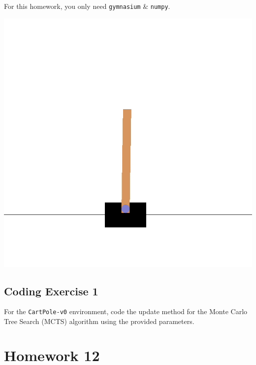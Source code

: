 \documentclass[
  letterpaper,
  DIV=11,
  numbers=noendperiod]{scrreprt}
\makeatletter
\newcommand*\pandocbounded[1]{%
  \sbox\pandoc@box{#1}%
  \Gscale@div\@tempa{\textheight}{\dimexpr\ht\pandoc@box+\dp\pandoc@box\relax}%
  \Gscale@div\@tempb{\linewidth}{\wd\pandoc@box}%
  \ifdim\@tempb\p@<\@tempa\p@\let\@tempa\@tempb\fi%
  \ifdim\@tempa\p@<\p@\scalebox{\@tempa}{\usebox\pandoc@box}%
  \else\usebox{\pandoc@box}%
  \fi%
}
\makeatother
\begin{document}
\begin{tcolorbox}[enhanced jigsaw, opacityback=0, left=2mm, breakable, bottomtitle=1mm, rightrule=.15mm, colframe=quarto-callout-note-color-frame, titlerule=0mm, colback=white, opacitybacktitle=0.6, toptitle=1mm, title=\textcolor{quarto-callout-note-color}{\faInfo}\hspace{0.5em}{Note}, colbacktitle=quarto-callout-note-color!10!white, bottomrule=.15mm, arc=.35mm, coltitle=black, leftrule=.75mm, toprule=.15mm]

For this homework, you only need \texttt{gymnasium} \& \texttt{numpy}.

\end{tcolorbox}

\begin{center}
\includegraphics[width=0.4\linewidth,height=\textheight,keepaspectratio]{homework/images/cartpole.gif}
\end{center}

\section{Coding Exercise 1}\label{coding-exercise-1-8}

For the \texttt{CartPole-v0} environment, code the update method for the
Monte Carlo Tree Search (MCTS) algorithm using the provided parameters.

\section{\texorpdfstring{\href{https://colab.research.google.com/drive/1Y_A4uKoSmjc6EmU-Or7tbeo3fe_ZD4RH?usp=sharing}{\protect\pandocbounded{}}}{}}\label{section-9}

\chapter{Homework 12}\label{homework-12}
\end{document}

